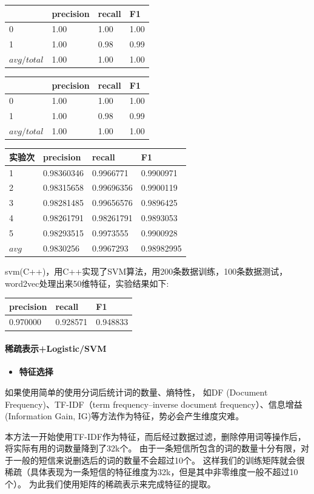 \documentclass{article}
\begin{document}
\begin{longtable}[]{@{}llll@{}}
\toprule
& precision & recall & F1\tabularnewline
\midrule
\endhead
0 & 1.00 & 1.00 & 1.00\tabularnewline
1 & 1.00 & 0.98 & 0.99\tabularnewline
\(avg/total\) & 1.00 & 1.00 & 1.00\tabularnewline
\bottomrule
\end{longtable}

\begin{longtable}[]{@{}llll@{}}
\toprule
& precision & recall & F1\tabularnewline
\midrule
\endhead
0 & 1.00 & 1.00 & 1.00\tabularnewline
1 & 1.00 & 0.98 & 0.99\tabularnewline
\(avg/total\) & 1.00 & 1.00 & 1.00\tabularnewline
\bottomrule
\end{longtable}

\begin{longtable}[]{@{}llll@{}}
\toprule
实验次 & precision & recall & F1\tabularnewline
\midrule
\endhead
1 & 0.98360346 & 0.9966771 & 0.9900971\tabularnewline
2 & 0.98315658 & 0.99696356 & 0.9900119\tabularnewline
3 & 0.98281485 & 0.99656576 & 0.9896425\tabularnewline
4 & 0.98261791 & 0.98261791 & 0.9893053\tabularnewline
5 & 0.98293515 & 0.9973555 & 0.9900928\tabularnewline
\(avg\) & 0.9830256 & 0.9967293 & 0.98982995\tabularnewline
\bottomrule
\end{longtable}

svm(C++)，用C++实现了SVM算法，用200条数据训练，100条数据测试，word2vec处理出来50维特征，实验结果如下:

\begin{longtable}[]{@{}lll@{}}
\toprule
precision & recall & F1\tabularnewline
\midrule
\endhead
0.970000 & 0.928571 & 0.948833\tabularnewline
\bottomrule
\end{longtable}

\paragraph{稀疏表示+Logistic/SVM}\label{ux7a00ux758fux8868ux793alogisticsvm}

\begin{itemize}
\tightlist
\item
  \textbf{特征选择}
\end{itemize}

如果使用简单的使用分词后统计词的数量、熵特性， 如DF (Document
Frequency)、TF-IDF（term frequency--inverse document
frequency）、信息增益 (Information Gain,
IG)等方法作为特征，势必会产生维度灾难。

本方法一开始使用TF-IDF作为特征，而后经过数据过滤，删除停用词等操作后，将实际有用的词数量降到了32k个。
由于一条短信所包含的词的数量十分有限，对于一般的短信来说删选后的词的数量不会超过10个。
这样我们的训练矩阵就会很稀疏（具体表现为一条短信的特征维度为32k，但是其中非零维度一般不超过10个）。
为此我们使用矩阵的稀疏表示来完成特征的提取。
\end{document}
